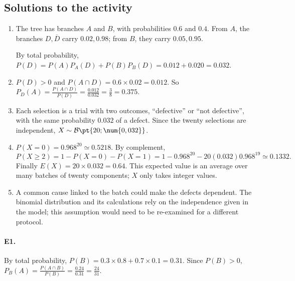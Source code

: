 \subsection{Solutions to the activity}\begin{enumerate}
\item The tree has branches $A$ and $B$, with probabilities $\num{0,6}$ and $\num{0,4}$. From $A$, the branches $D,\overline D$ carry $\num{0,02},\num{0,98}$; from $B$, they carry $\num{0,05},\num{0,95}$.
\begin{center}\end{center}
By total probability, $P(D)=P(A)P_A(D)+P(B)P_B(D)=\num{0,012}+\num{0,020}=\num{0,032}$.
\item $P(D)>0$ and $P(A\cap D)=\num{0,6}\times\num{0,02}=\num{0,012}$. So $P_D(A)=\frac{P(A\cap D)}{P(D)}=\frac{\num{0,012}}{\num{0,032}}=\frac{3}{8}=\num{0,375}$.
\item Each selection is a trial with two outcomes, ``defective'' or ``not defective'', with the same probability $\num{0,032}$ of a defect. Since the twenty selections are independent, $X\sim\mathcal B\pt{20;\num{0,032}}$.
\item $P(X=0)=\num{0,968}^{20}\simeq\num{0,5218}$. By complement,
\[P(X\ge2)=1-P(X=0)-P(X=1)=1-\num{0,968}^{20}-20(\num{0,032})\num{0,968}^{19}\simeq\num{0,1332}.\]
Finally $E(X)=20\times\num{0,032}=\num{0,64}$. This expected value is an average over many batches of twenty components; $X$ only takes integer values.
\item A common cause linked to the batch could make the defects dependent. The binomial distribution and its calculations rely on the independence given in the model; this assumption would need to be re-examined for a different protocol.
\end{enumerate}

\paragraph{E1.}By total probability, $P(B)=\num{0,3}\times\num{0,8}+\num{0,7}\times\num{0,1}=\num{0,31}$. Since $P(B)>0$, $P_B(A)=\frac{P(A\cap B)}{P(B)}=\frac{\num{0,24}}{\num{0,31}}=\frac{24}{31}$.

